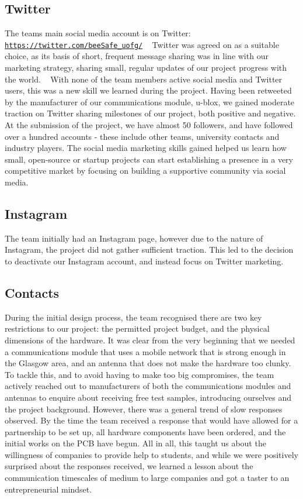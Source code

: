 \subsection*{Twitter}

The team\textquotesingle{}s main social media account is on Twitter\+: \href{https://twitter.com/beeSafe_uofg/}{\tt https\+://twitter.\+com/bee\+Safe\+\_\+uofg/} ~\newline
 Twitter was agreed on as a suitable choice, as its basis of short, frequent message sharing was in line with our marketing strategy, sharing small, regular updates of our project progress with the world. ~\newline
 With none of the team members active social media and Twitter users, this was a new skill we learned during the project. Having been retweeted by the manufacturer of our communications module, u-\/blox, we gained moderate traction on Twitter sharing milestones of our project, both positive and negative. At the submission of the project, we have almost 50 followers, and have followed over a hundred accounts -\/ these include other teams, university contacts and industry players. The social media marketing skills gained helped us learn how small, open-\/source or startup projects can start establishing a presence in a very competitive market by focusing on building a supportive community via social media.

\subsection*{Instagram}

The team initially had an Instagram page, however due to the nature of Instagram, the project did not gather sufficient traction. This led to the decision to deactivate our Instagram account, and instead focus on Twitter marketing.

\subsection*{Contacts}

During the initial design process, the team recognised there are two key restrictions to our project\+: the permitted project budget, and the physical dimensions of the hardware. It was clear from the very beginning that we needed a communications module that uses a mobile network that is strong enough in the Glasgow area, and an antenna that does not make the hardware too clunky. To tackle this, and to avoid having to make too big compromises, the team actively reached out to manufacturers of both the communications modules and antennas to enquire about receiving free test samples, introducing ourselves and the project background. However, there was a general trend of slow responses observed. By the time the team received a response that would have allowed for a partnership to be set up, all hardware components have been ordered, and the initial works on the P\+CB have begun. All in all, this taught us about the willingness of companies to provide help to students, and while we were positively surprised about the responses received, we learned a lesson about the communication timescales of medium to large companies and got a taster to an entrepreneurial mindset. 